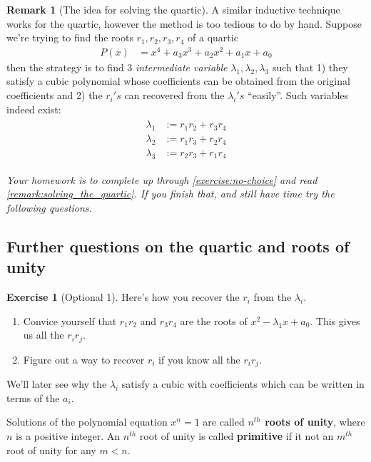 \documentclass[reqno, 12pt, letter]{article}
\theoremstyle{plain}
\theoremstyle{definition}
\newtheorem{remark}[theorem]{Remark}
\newtheorem{exercise}[theorem]{Exercise}
\theoremstyle{remark}
\numberwithin{equation}{section}
\begin{document}
	\begin{remark}[The idea for solving the quartic]
		\label{remark:solving_the_quartic}
		A similar inductive technique works for the quartic, however the method is too tedious to do by hand. Suppose we're trying to find the roots $ r_1, r_2, r_3, r_4$ of a quartic \begin{align*}
			P(x) &= x^4 + a_3x^3 + a_2x^2 + a_1x + a_0
		\end{align*}
		then the strategy is to find 3 \emph{intermediate variable} $ \lambda_1, \lambda_2, \lambda_3$ such that 1) they satisfy a cubic polynomial whose coefficients can be obtained from the original coefficients and 2) the $r_i's$ can recovered from the $ \lambda_i's$ ``easily''. Such variables indeed exist:
			\begin{align}
				\label{equation:intermediate_variables_quartic}
				\begin{split}
					\lambda_1 &:= r_1 r_2 + r_3 r_4 \\
					\lambda_2 &:= r_1 r_3 + r_2 r_4 \\
					\lambda_3 &:= r_2 r_3 + r_1 r_4 
				\end{split}
			\end{align}
			
			{\it Your homework is to complete up through \autoref{exercise:no-choice} and read \autoref{remark:solving_the_quartic}. If you finish that, and still have time try the following questions.}
\subsection{Further questions on the quartic and roots of unity}			
		\begin{exercise}[Optional 1]
			Here's how you recover the $ r_i$ from the $ \lambda_i$.
			\begin{enumerate}
				\item Convice yourself that $ r_1 r_2$ and $r_3 r_4$ are the roots of $ x^2 - \lambda_1 x + a_0$. This gives us all the $ r_i r_j$.
				\item Figure out a way to recover $ r_i$ if you know all the $ r_i r_j$.
			\end{enumerate}
		\end{exercise}
		We'll later see why the $ \lambda_i$ satisfy a cubic with coefficients which can be written in terms of the $ a_i$.
	\end{remark}
	
		Solutions of the polynomial equation $ x^n = 1$ are called \textbf{$n^{th}$ roots of unity}, where $ n$ is a positive integer. An $ n^{th}$ root of unity is called \textbf{primitive} if it not an $ m^{th}$ root of unity for any $ m < n$.
	
\end{document}
